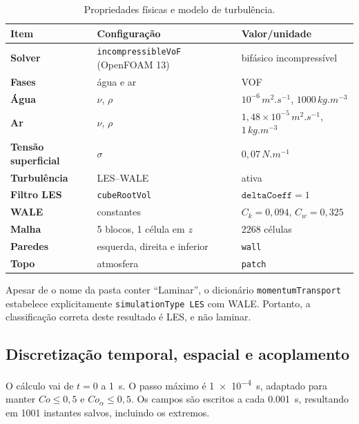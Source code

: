 \documentclass[12pt,a4paper]{article}
\newcommand{\code}[1]{\texttt{#1}}
\begin{document}
\begin{table}[H]
\centering
\caption{Propriedades físicas e modelo de turbulência.}
\label{tab:fisica}
\begin{tabularx}{\textwidth}{>{\bfseries}l X l}
\toprule
Item & Configuração & Valor/unidade\\
\midrule
Solver & \code{incompressibleVoF} (OpenFOAM 13) & bifásico incompressível\\
Fases & água e ar & VOF\\
Água & $\nu$, $\rho$ & $10^{-6}\,\si{m^2.s^{-1}}$, $1000\,\si{kg.m^{-3}}$\\
Ar & $\nu$, $\rho$ & $1{,}48\times10^{-5}\,\si{m^2.s^{-1}}$, $1\,\si{kg.m^{-3}}$\\
Tensão superficial & $\sigma$ & $0{,}07\,\si{N.m^{-1}}$\\
Turbulência & LES--WALE & ativa\\
Filtro LES & \code{cubeRootVol} & $\texttt{deltaCoeff}=1$\\
WALE & constantes & $C_k=0{,}094$, $C_w=0{,}325$\\
Malha & 5 blocos, 1 célula em $z$ & 2268 células\\
Paredes & esquerda, direita e inferior & \code{wall}\\
Topo & atmosfera & \code{patch}\\
\bottomrule
\end{tabularx}
\end{table}

Apesar de o nome da pasta conter ``Laminar'', o dicionário \code{momentumTransport} estabelece explicitamente \code{simulationType LES} com WALE. Portanto, a classificação correta deste resultado é LES, e não laminar.

\subsection{Discretização temporal, espacial e acoplamento}
O cálculo vai de $t=0$ a \SI{1}{s}. O passo máximo é \SI{1e-4}{s}, adaptado para manter $Co\le0{,}5$ e $Co_\alpha\le0{,}5$. Os campos são escritos a cada \SI{0.001}{s}, resultando em 1001 instantes salvos, incluindo os extremos.
\end{document}
